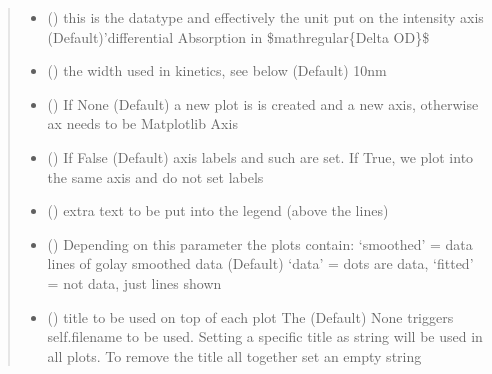 \documentclass[letterpaper,10pt,english]{sphinxmanual}
\begin{document}
\begin{fulllineitems}
\begin{quote}
\begin{description}
\begin{itemize}
\item {} 
 () \textendash{} this is the datatype and effectively the unit put on the intensity axis
(Default)’differential Absorption in \$mathregular\{Delta OD\}\$

\item {} 
 (\sphinxstyleliteralemphasis{\sphinxupquote{, }}) \textendash{} the width used in kinetics, see below (Default) 10nm

\item {} 
 (\sphinxstyleliteralemphasis{\sphinxupquote{, }}) \textendash{} If None (Default) a new plot is is created and a new axis, otherwise ax needs to be Matplotlib Axis

\item {} 
 (\sphinxstyleliteralemphasis{\sphinxupquote{, }}) \textendash{} If False (Default) axis labels and such are set. If True, we plot into the same axis and
do not set labels

\item {} 
 (\sphinxstyleliteralemphasis{\sphinxupquote{, }}\sphinxstyleliteralemphasis{\sphinxupquote{, }}) \textendash{} extra text to be put into the legend (above the lines)

\item {} 
 (\sphinxstyleliteralemphasis{\sphinxupquote{, }}) \textendash{} Depending on this parameter the plots contain:
‘smoothed’ = data lines of golay smoothed data (Default)
‘data’ = dots are data,
‘fitted’ = not data, just lines shown

\item {} 
 () \textendash{} title to be used on top of each plot
The (Default) None triggers  self.filename to be used. Setting a specific title as string will
be used in all plots. To remove the title all together set an empty string


\end{itemize}
\end{description}
\end{quote}
\end{fulllineitems}
\end{document}
